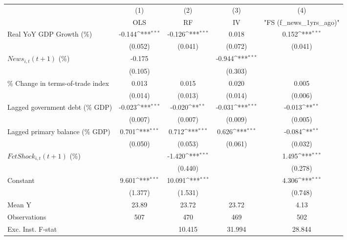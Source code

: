 {
\def\sym#1{\ifmmode^{#1}\else\(^{#1}\)\fi}
\begin{tabular}{l*{4}{c}}
\toprule
                    &\multicolumn{1}{c}{(1)}&\multicolumn{1}{c}{(2)}&\multicolumn{1}{c}{(3)}&\multicolumn{1}{c}{(4)}\\
                    &\multicolumn{1}{c}{OLS}&\multicolumn{1}{c}{RF}&\multicolumn{1}{c}{IV}&\multicolumn{1}{c}{ "FS (f_news_1yrs_ago)" }\\
\midrule
Real YoY GDP Growth (\%)&      -0.144\sym{***}&      -0.126\sym{***}&       0.018         &       0.152\sym{***}\\
                    &     (0.052)         &     (0.041)         &     (0.072)         &     (0.041)         \\
\addlinespace
$ News_{i,t}(t+1)$ (\%)&      -0.175         &                     &      -0.944\sym{***}&                     \\
                    &     (0.105)         &                     &     (0.303)         &                     \\
\addlinespace
\% Change in terms-of-trade index&       0.013         &       0.015         &       0.020         &       0.005         \\
                    &     (0.014)         &     (0.013)         &     (0.014)         &     (0.006)         \\
\addlinespace
Lagged government debt (\% GDP)&      -0.023\sym{***}&      -0.020\sym{**} &      -0.031\sym{***}&      -0.013\sym{**} \\
                    &     (0.007)         &     (0.007)         &     (0.009)         &     (0.005)         \\
\addlinespace
Lagged primary balance (\% GDP)&       0.701\sym{***}&       0.712\sym{***}&       0.626\sym{***}&      -0.084\sym{**} \\
                    &     (0.050)         &     (0.053)         &     (0.061)         &     (0.032)         \\
\addlinespace
$ FctShock_{i,t}(t+1)$ (\%)&                     &      -1.420\sym{***}&                     &       1.495\sym{***}\\
                    &                     &     (0.440)         &                     &     (0.278)         \\
\addlinespace
Constant            &       9.601\sym{***}&      10.091\sym{***}&                     &       4.306\sym{***}\\
                    &     (1.377)         &     (1.531)         &                     &     (0.748)         \\
\midrule
Mean Y              &       23.89         &       23.72         &       23.72         &        4.13         \\
Observations        &         507         &         470         &         469         &         502         \\
Exc. Inst. F-stat   &                     &      10.415         &      31.994         &      28.844         \\
\bottomrule
\end{tabular}
}
